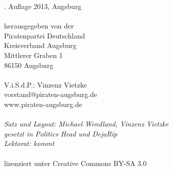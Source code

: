 \vspace*{\fill}
\begin{minipage}{\textwidth}
  \begin{small}
    . Auflage 2013, Augsburg\\
    \\
    herausgegeben von der\\
    Piratenpartei Deutschland\\
    Kreisverband Augsburg\\
    Mittlerer Graben 1\\
    86150 Augsburg\\
    \\
    V.i.S.d.P.: Vinzenz Vietzke\\
    vorstand@piraten-augsburg.de\\
    www.piraten-augsburg.de\\
    \\
    \textit{
    Satz und Layout: Michael Wendland, Vinzenz Vietzke\\
    gesetzt in Politics Head und DejaRip\\
    Lektorat: kommt
    }\\
    \\
    lizenziert unter Creative Commons BY-SA 3.0
  \end{small}
\end{minipage}

